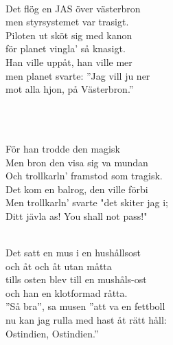  \\       

\songtext{}Det flög en JAS över västerbron \\
men styrsystemet var trasigt.\\
Piloten ut sköt sig med kanon\\
för planet vingla' så knasigt.\\
Han ville uppåt, han ville mer\\
men planet svarte: ”Jag vill ju ner\\
mot alla hjon, på Västerbron.” 


\newpage

 \\       

\\
För han trodde den magisk\\
Men bron den visa sig va mundan\\
Och trollkarln’ framstod som tragisk.\\ 
Det kom en balrog, den ville förbi\\
Men trollkarln’ svarte "det skiter jag i;\\ 
Ditt jävla as! You shall not pass!" \\


 \\       

\songtext{}Det satt en mus i en hushållsost\\
och åt och åt utan måtta\\ 
tills osten blev till en mushåls-ost\\ 
och han en klotformad råtta.\\ 
”Så bra”, sa musen ”att va en fettboll\\ 
nu kan jag rulla med hast åt rätt håll:\\ 
Ostindien, Ostindien.” \\

\newpage 


